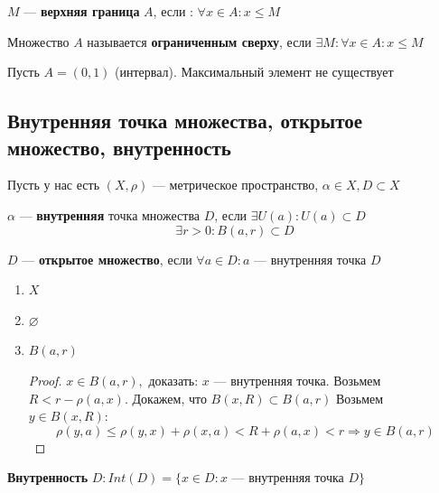 	\begin{definition}
		$M$ --- \textbf{верхняя граница} $A$,  если : $ \forall x \in A : x \le M $
	\end{definition}
	
	\begin{definition}
		Множество $A$ называется \textbf{ограниченным сверху}, если $\exists M : \forall x \in A: x \le M $
	\end{definition}
	
	\begin{remark}
		Пусть $A = (0, 1)$ (интервал). Максимальный элемент не существует
	\end{remark}
	
\newpage
\subsection{Внутренняя точка множества, открытое множество, внутренность}
    Пусть у нас есть $(X,\rho)$ --- метрическое пространство, $\alpha \in X, D \subset X$
	
	\begin{definition}
		$\alpha $ --- \textbf{внутренняя} точка множества $D$, если $\exists U(a): U(a) \subset D$
		$$\exists r > 0: B(a,r) \subset D$$
	\end{definition}
	
	\begin{definition}
		$D$ --- \textbf{открытое множество}, если $\forall a \in D : a$ --- внутренняя точка $D$
	\end{definition}
	
	\begin{example} \nobreakspace
		\begin{enumerate}
		  \item $X$
		  \item $\varnothing$
		  \item $B(a,r)$
		  \begin{proof}
		  		$x \in B(a,r), $ доказать: $x$ --- внутренняя точка. Возьмем $R < r - \rho(a,x). $ Докажем, что $B(x,R) \subset B(a,r)$
		  		Возьмем $y \in B(x,R):$
		  		$$ \rho(y,a) \le \rho(y,x) + \rho(x,a) < R + \rho(a,x) < r \Rightarrow y \in B(a,r)$$
		  \end{proof}
		\end{enumerate}
	\end{example}
	
	\begin{definition}
		\textbf{Внутренность} $D: Int(D) = \{ x \in D: x $ --- внутренняя точка $D \}$
	\end{definition}
	
